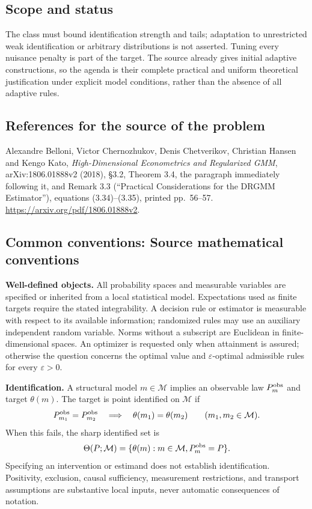 \documentclass[11pt,a4paper]{article}
\begin{document}
\subsection*{Scope and status}
The class must bound identification strength and tails; adaptation to
unrestricted weak identification or arbitrary distributions is not
asserted. Tuning every nuisance penalty is part of the target. The
source already gives initial adaptive constructions, so the agenda is
their complete practical and uniform theoretical justification under
explicit model conditions, rather than the absence of all adaptive rules.
\subsection*{References for the source of the problem}
Alexandre Belloni, Victor Chernozhukov, Denis Chetverikov, Christian
Hansen and Kengo Kato, \emph{High-Dimensional Econometrics and
Regularized GMM}, arXiv:1806.01888v2 (2018), \S3.2, Theorem 3.4,
the paragraph immediately following it, and Remark 3.3
(``Practical Considerations for the DRGMM Estimator''), equations
(3.34)--(3.35), printed pp.~56--57.
\url{https://arxiv.org/pdf/1806.01888v2}.

\subsection*{Common conventions: Source mathematical conventions}

\textbf{Well-defined objects.}
All probability spaces and measurable variables are specified or inherited
from a local statistical model. Expectations used as finite targets require
the stated integrability. A decision rule or estimator is measurable with
respect to its available information; randomized rules may use an auxiliary
independent random variable. Norms without a subscript are Euclidean in
finite-dimensional spaces. An optimizer is requested only when attainment
is assured; otherwise the question concerns the optimal value and
$\varepsilon$-optimal admissible rules for every $\varepsilon>0$.

\textbf{Identification.}
A structural model $m\in\mathcal M$ implies an observable law
$P_m^{\rm obs}$ and target $\theta(m)$. The target is point identified on
$\mathcal M$ if
\[
 P_{m_1}^{\rm obs}=P_{m_2}^{\rm obs}
 \quad\Longrightarrow\quad\theta(m_1)=\theta(m_2)
 \qquad(m_1,m_2\in\mathcal M).
\]
When this fails, the sharp identified set is
\[
 \Theta(P;\mathcal M)=\{\theta(m):m\in\mathcal M,
                                  P_m^{\rm obs}=P\}.
\]
Specifying an intervention or estimand does not establish identification.
Positivity, exclusion, causal sufficiency, measurement restrictions, and
transport assumptions are substantive local inputs, never automatic
consequences of notation.
\end{document}
